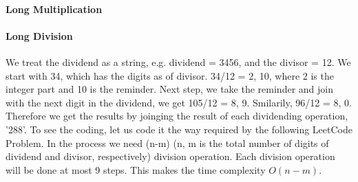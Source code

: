 \documentclass[../main.tex]{subfiles}
\begin{document}
\paragraph{Long Multiplication} 

\paragraph{Long Division} We treat the dividend as a string, e.g. dividend = 3456, and the divisor = 12. We start with 34, which has the digits as of divisor. 34/12 = 2, 10, where 2 is the integer part and 10 is the reminder. Next step, we take the reminder and join with the next digit in the dividend, we get 105/12 = 8, 9. Smilarily, 96/12 = 8, 0. Therefore we get the results by joinging the result of each dividending operation, '288'.  To see the coding, let us code it the way required by the following LeetCode Problem. In the process we need (n-m) (n, m is the total number of digits of dividend and divisor, respectively) division operation. Each division operation will be done at most 9 steps. This makes the time complexity $O(n-m)$.
\end{document}
